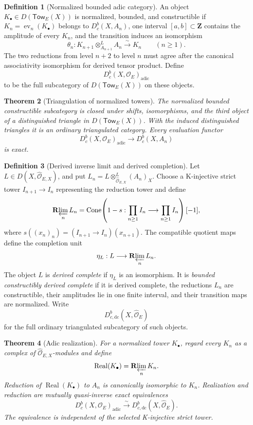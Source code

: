 \documentclass[10pt]{article}
\newtheorem{theorem}{Theorem}[section]
\theoremstyle{definition}
\newtheorem{definition}[theorem]{Definition}
\begin{document}
\begin{definition}[Normalized bounded adic category]
An object \(K_\bullet\in D(\mathsf{Tow}_E(X))\) is normalized, bounded,
and constructible if \(K_n=\operatorname{ev}_n(K_\bullet)\) belongs to
\(D^b_c(X,A_n)\), one interval \([a,b]\subset\mathbf Z\) contains the
amplitude of every \(K_n\), and the transition induces an isomorphism
\[
 \theta_n:K_{n+1}\otimes^L_{A_{n+1}}A_n
                         \xrightarrow{\sim}K_n
 \qquad(n\ge1).
\]
The two reductions from level \(n+2\) to level \(n\) must agree after the
canonical associativity isomorphism for derived tensor product.  Define
\[
 D^b_c(X,\mathcal O_E)_{\mathrm{adic}}
\]
to be the full subcategory of \(D(\mathsf{Tow}_E(X))\) on these objects.
\end{definition}

\begin{theorem}[Triangulation of normalized towers]
The normalized bounded constructible subcategory is closed under shifts,
isomorphisms, and the third object of a distinguished triangle in
\(D(\mathsf{Tow}_E(X))\).  With the induced distinguished triangles it is
an ordinary triangulated category.  Every evaluation functor
\[
 D^b_c(X,\mathcal O_E)_{\mathrm{adic}}\longrightarrow D^b_c(X,A_n)
\]
is exact.
\end{theorem}

\begin{definition}[Derived inverse limit and derived completion]
Let \(L\in D(X,\widehat{\mathcal O}_{E,X})\), and put
\(L_n=L\otimes^L_{\widehat{\mathcal O}_{E,X}}(A_n)_X\).  Choose a
K-injective strict tower \(I_{n+1}\to I_n\) representing the reduction
tower and define
\[
 \mathbf R\!\varprojlim_nL_n
 =\operatorname{Cone}\!\left(
  1-s:\prod_{n\ge1}I_n\longrightarrow\prod_{n\ge1}I_n
 \right)[-1],
\]
where \(s((x_n)_n)=(I_{n+1}\to I_n)(x_{n+1})\).  The compatible quotient
maps define the completion unit
\[
                   \eta_L:L\longrightarrow\mathbf R\!\varprojlim_nL_n.
\]
The object \(L\) is \emph{derived complete} if \(\eta_L\) is an
isomorphism.  It is \emph{bounded constructibly derived complete} if it is
derived complete, the reductions \(L_n\) are constructible, their
amplitudes lie in one finite interval, and their transition maps are
normalized.  Write
\[
 D^b_{c,\mathrm{dc}}(X,\widehat{\mathcal O}_E)
\]
for the full ordinary triangulated subcategory of such objects.
\end{definition}

\begin{theorem}[Adic realization]
For a normalized tower \(K_\bullet\), regard every \(K_n\) as a complex of
\(\widehat{\mathcal O}_{E,X}\)-modules and define
\[
                \operatorname{Real}(K_\bullet)
                    =\mathbf R\!\varprojlim_nK_n.
\]
Reduction of \(\operatorname{Real}(K_\bullet)\) to \(A_n\) is canonically
isomorphic to \(K_n\).  Realization and reduction are mutually
quasi-inverse exact equivalences
\[
 D^b_c(X,\mathcal O_E)_{\mathrm{adic}}
   \xrightarrow{\sim}
 D^b_{c,\mathrm{dc}}(X,\widehat{\mathcal O}_E).
\]
The equivalence is independent of the selected K-injective strict tower.
\end{theorem}
\end{document}
